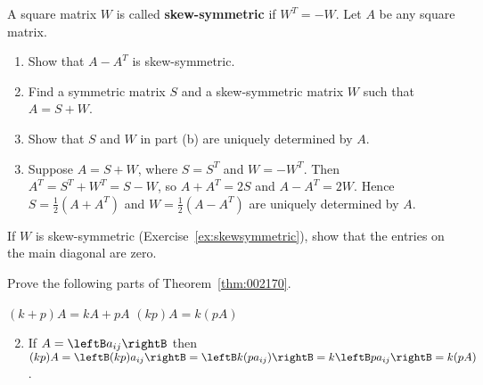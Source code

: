 \begin{multicols}{2}
\begin{ex}\label{ex:skewsymmetric}
A square matrix $W$ is called \textbf{skew-symmetric} if $W^{T} = -W$. Let $A$ be any square matrix.


\begin{enumerate}[label={\alph*.}]
\item Show that $A - A^{T}$ is skew-symmetric.

\item Find a symmetric matrix $S$ and a skew-symmetric matrix $W$ such that $A = S + W$.

\item Show that $S$ and $W$ in part (b) are uniquely determined by $A$.

\end{enumerate}
\begin{sol}
\begin{enumerate}[label={\alph*.}]
\setcounter{enumi}{2}
\item  Suppose $A = S + W$, where $S = S^{T}$ and $W = -W^{T}$. Then $A^{T} = S^{T} + W^{T} = S - W$, so $A + A^{T} = 2S$ and $A - A^{T} = 2W$. Hence $S = \frac{1}{2}(A + A^{T})$ and $W = \frac{1}{2}(A - A^{T})$ are uniquely determined by $A$.

\end{enumerate}
\end{sol}
\end{ex}

\begin{ex}
If $W$ is skew-symmetric (Exercise~\ref{ex:skewsymmetric}), show that the entries on the main diagonal are zero. 
\end{ex}

\begin{ex}
Prove the following parts of Theorem~\ref{thm:002170}.
\begin{exenumerate}
\exitem $(k + p)A = kA + pA$
\exitem $(kp)A = k(pA)$
\end{exenumerate}
\begin{sol}
\begin{enumerate}[label={\alph*.}]
\setcounter{enumi}{1}
\item  If $A = \leftB a_{ij} \rightB$ then $(kp)A = \leftB (kp)a_{ij} \rightB = \leftB k(pa_{ij}) \rightB = k \leftB pa_{ij} \rightB = k(pA)$.

\end{enumerate}
\end{sol}
\end{ex}


\end{multicols}
